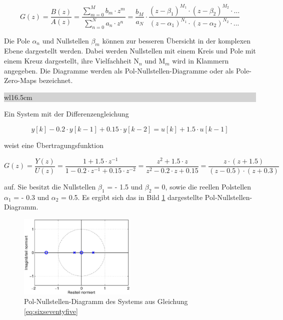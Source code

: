 \begin{equation}\label{eq:sixseventyfive}
G\left(z\right)=\frac{B\left(z\right)}{A\left(z\right)} =\frac{\sum _{m=0}^{M}b_{m} \cdot z^{m}  }{\sum _{n=0}^{N}a_{n} \cdot z^{n}  } =\frac{b_{M} }{a_{N} } \cdot \frac{\left(z-\beta _{1} \right)^{M_{1} } \cdot \left(z-\beta _{2} \right)^{M_{2} } \cdot ...}{\left(z-\alpha _{1} \right)^{N_{1} } \cdot \left(z-\alpha _{2} \right)^{N_{2} } \cdot ...}
\end{equation}

\noindent Die Pole $\alpha_{n}$ und Nullstellen $\beta_{m}$ k\"{o}nnen zur besseren \"{U}bersicht in der komplexen Ebene dargestellt werden. Dabei werden Nullstellen mit einem Kreis und Pole mit einem Kreuz dargestellt, ihre Vielfachheit N${}_{n}$ und M${}_{m}$ wird in Klammern angegeben. Die Diagramme werden als Pol-Nullstellen-Diagramme oder als Pole-Zero-Maps bezeichnet.\bigskip

\noindent
\colorbox{lightgray}{%
%
\renewcommand\arraystretch{0.6}%
\begin{tabular}{ wl{16.5cm} }
{\selectfont{Beispiel: Pol-Nullstellen-Diagramm}}
\end{tabular}%
}\medskip

\noindent Ein System mit der Differenzengleichung 

\begin{equation}\label{eq:sixseventysix}
y\left[k\right]-0.2\cdot y\left[k-1\right]+0.15\cdot y\left[k-2\right]=u\left[k\right]+1.5\cdot u\left[k-1\right]
\end{equation}

\noindent weist eine \"{U}bertragungsfunktion 

\begin{equation}\label{eq:sixseventyseven}
G\left(z\right)=\frac{Y\left(z\right)}{U\left(z\right)} =\frac{1+1.5\cdot z^{-1} }{1-0.2\cdot z^{-1} +0.15\cdot z^{-2} } =\frac{z^{2} +1.5\cdot z}{z^{2} -0.2\cdot z+0.15} =\frac{z\cdot \left(z+1.5\right)}{\left(z-0.5\right)\cdot \left(z+0.3\right)}
\end{equation}

\noindent auf. Sie besitzt die Nullstellen $\beta_{1}$ = - 1.5 und $\beta_{2}$ = 0, sowie die reellen Polstellen $\alpha_{1}$ = - 0.3 und $\alpha_{2}$ = 0.5. Es ergibt sich das in Bild \ref{fig:zSysteme_PolNullstellenDiagramm} dargestellte Pol-Nullstellen-Diagramm.

\begin{figure}[H]
  \centerline{\includegraphics[width=0.5\textwidth]{Kapitel6/Bilder/image9.eps}}
  \caption{Pol-Nullstellen-Diagramm des Systems aus Gleichung \eqref{eq:sixseventyfive}}
  \label{fig:zSysteme_PolNullstellenDiagramm}
\end{figure}

